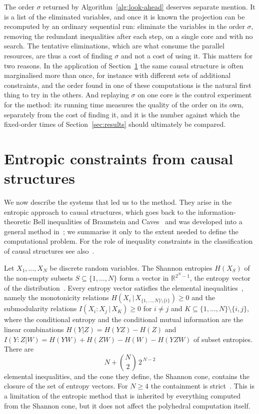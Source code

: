 \documentclass[11pt]{article}
\theoremstyle{definition}
\begin{document}
The order $\sigma$ returned by Algorithm~\ref{alg:look-ahead} deserves separate mention. It is a list of the eliminated variables, and once it is known the projection can be recomputed by an ordinary sequential run: eliminate the variables in the order $\sigma$, removing the redundant inequalities after each step, on a single core and with no search. The tentative eliminations, which are what consume the parallel resources, are thus a cost of finding $\sigma$ and not a cost of using it. This matters for two reasons. In the application of Section~\ref{sec:causal} the same causal structure is often marginalised more than once, for instance with different sets of additional constraints, and the order found in one of these computations is the natural first thing to try in the others. And replaying $\sigma$ on one core is the control experiment for the method: its running time measures the quality of the order on its own, separately from the cost of finding it, and it is the number against which the fixed-order times of Section~\ref{sec:results} should ultimately be compared.

\section{Entropic constraints from causal structures}
\label{sec:causal}

We now describe the systems that led us to the method. They arise in the entropic approach to causal structures, which goes back to the information-theoretic Bell inequalities of Braunstein and Caves~\cite{braunstein1988} and was developed into a general method in~\cite{fritzchaves2013,chaves2014,chaves2015,weilenmann2017}; we summarise it only to the extent needed to define the computational problem. For the role of inequality constraints in the classification of causal structures see also~\cite{khanna2024, khanna2025closing, khanna2026spurious, hlp2014}.

Let $X_1,\dots,X_N$ be discrete random variables. The Shannon entropies $H(X_S)$ of the non-empty subsets $S\subseteq\{1,\dots,N\}$ form a vector in $\mathbb{R}^{2^N-1}$, the entropy vector of the distribution~\cite{shannon1948,yeung2002}. Every entropy vector satisfies the elemental inequalities~\cite{yeung1997}, namely the monotonicity relations $H(X_i\,|\,X_{\{1,\dots,N\}\setminus\{i\}})\ge 0$ and the submodularity relations $I(X_i\!:\!X_j\,|\,X_K)\ge 0$ for $i\neq j$ and $K\subseteq\{1,\dots,N\}\setminus\{i,j\}$, where the conditional entropy and the conditional mutual information are the linear combinations $H(Y|Z)=H(YZ)-H(Z)$ and $I(Y\!:\!Z|W)=H(YW)+H(ZW)-H(W)-H(YZW)$ of subset entropies. There are
\begin{equation}
N+\binom{N}{2}\,2^{\,N-2}
\label{eq:elementalcount}
\end{equation}
elemental inequalities, and the cone they define, the Shannon cone, contains the closure of the set of entropy vectors. For $N\ge 4$ the containment is strict~\cite{zhangyeung1997,zhangyeung1998}. This is a limitation of the entropic method that is inherited by everything computed from the Shannon cone, but it does not affect the polyhedral computation itself.
\end{document}

